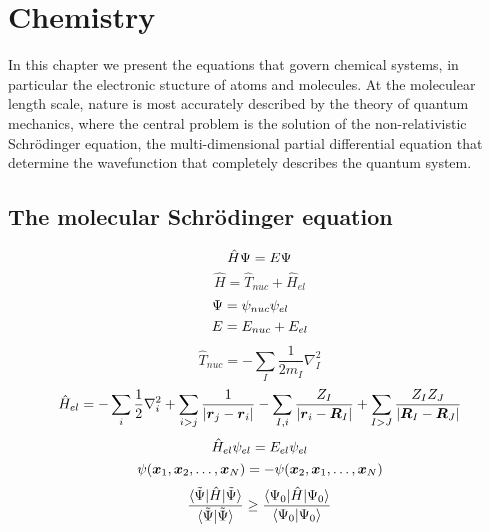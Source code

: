 \chapter{Chemistry}
In this chapter we present the equations that govern chemical systems, in particular
the electronic stucture of atoms and molecules. At the moleculear length scale, nature
is most accurately described by the theory of quantum mechanics, where the central
problem is the solution of the non-relativistic Schr\"{o}dinger equation, the 
multi-dimensional partial differential equation that determine the wavefunction 
\Wavefunction that completely describes the quantum system.

\section{The molecular Schr\"{o}dinger equation}\label{sec:schrodinger}
\begin{equation}
    \hat{H}\Psi = E\Psi
\end{equation}
\begin{equation}
    \hat{H} = \hat{T}_{nuc} + \hat{H}_{el}
\end{equation}
\begin{align}
    \Psi &= \psi_{nuc}\psi_{el}\\
    E &= E_{nuc} + E_{el}
\end{align}
\begin{equation}
    \hat{T}_{nuc} = -\sum_I\frac{1}{2m_I} \nabla_I^2
\end{equation}
\begin{equation}
    \hat{H}_{el} = -\sum_i \frac{1}{2}\nabla_i^2 
	+ \sum_{i>j} \frac{1}{|\boldsymbol r_j-\boldsymbol r_i|}
	- \sum_{I,i} \frac{Z_I}{|\boldsymbol r_i-\boldsymbol R_I|}
        + \sum_{I>J} \frac{Z_IZ_J}{|\boldsymbol R_I-\boldsymbol R_J|}
\end{equation}
\begin{equation}
    \hat{H}_{el}\psi_{el} = E_{el}\psi_{el}
\end{equation}
\begin{equation}
    \psi(\boldsymbol x_1,\boldsymbol x_2,\dots,\boldsymbol x_N) = -
    \psi(\boldsymbol x_2,\boldsymbol x_1,\dots,\boldsymbol x_N)
\end{equation}
\begin{equation}
    \label{eq:var_princ}
    \frac{\langle\tilde{\Psi}|\hat{H}|\tilde{\Psi}\rangle}
    {\langle\tilde{\Psi}|\tilde{\Psi}\rangle}
    \geq
    \frac{\langle\Psi_0|\hat{H}|\Psi_0\rangle}
    {\langle\Psi_0|\Psi_0\rangle}
\end{equation}

